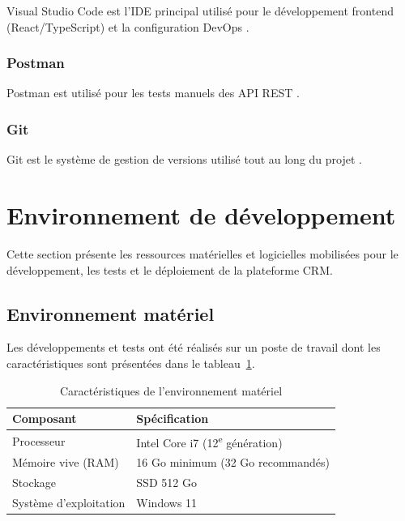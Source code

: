 \noindent Visual Studio Code est l'IDE principal utilisé pour le développement frontend
(React/TypeScript) et la configuration DevOps \cite{VSCode}.

\subsubsection{Postman}

\noindent Postman est utilisé pour les tests manuels des API REST \cite{Postman}.

\subsubsection{Git}

\noindent Git est le système de gestion de versions utilisé tout au long du projet
\cite{Git}.

\section{Environnement de développement}
\label{sec:chap3_environnement_developpement}

\noindent Cette section présente les ressources matérielles et logicielles mobilisées
pour le développement, les tests et le déploiement de la plateforme CRM.

\subsection{Environnement matériel}

\noindent Les développements et tests ont été réalisés sur un poste de travail dont les
caractéristiques sont présentées dans le tableau~\ref{tab:env_materiel}.

\begin{table}[H]
    \centering
    \caption{Caractéristiques de l'environnement matériel}
    \label{tab:env_materiel}
    \renewcommand{\arraystretch}{1.3}
    \begin{tabular}{|l|l|}
        \hline
        \textbf{Composant} & \textbf{Spécification} \\
        \hline
        Processeur & Intel Core i7 (12\textsuperscript{e} génération) \\
        \hline
        Mémoire vive (RAM) & 16 Go minimum (32 Go recommandés) \\
        \hline
        Stockage & SSD 512 Go \\
        \hline
        Système d'exploitation & Windows 11 \\
        \hline
    \end{tabular}
\end{table}

